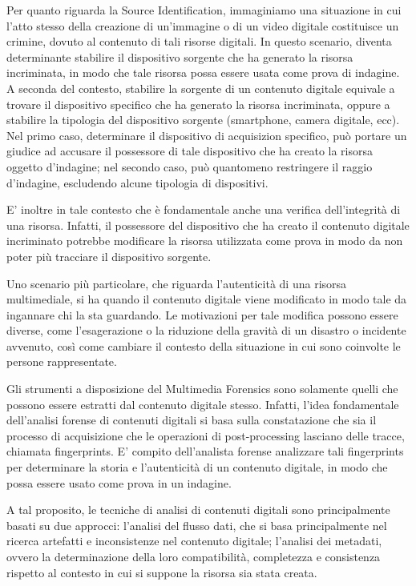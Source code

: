 Per quanto riguarda la Source Identification, immaginiamo una situazione in cui l'atto stesso della creazione di un'immagine o di un video digitale costituisce un crimine, dovuto al contenuto di tali risorse digitali. In questo scenario, diventa determinante stabilire il dispositivo sorgente che ha generato la risorsa incriminata, in modo che tale risorsa possa essere usata come prova di indagine. A seconda del contesto, stabilire la sorgente di un contenuto digitale equivale a trovare il dispositivo specifico che ha generato la risorsa incriminata, oppure a stabilire la tipologia del dispositivo sorgente (smartphone, camera digitale, ecc). Nel primo caso, determinare il dispositivo di acquisizion specifico, può portare un giudice ad accusare il possessore di tale dispositivo che ha creato la risorsa oggetto d'indagine; nel secondo caso, può quantomeno restringere il raggio d'indagine, escludendo alcune tipologia di dispositivi.

E' inoltre in tale contesto che è fondamentale anche una verifica dell'integrità di una risorsa. Infatti, il possessore del dispositivo che ha creato il contenuto digitale incriminato potrebbe modificare la risorsa utilizzata come prova in modo da non poter più tracciare il dispositivo sorgente.

Uno scenario più particolare, che riguarda l'autenticità di una risorsa multimediale, si ha quando il contenuto digitale viene modificato in modo tale da ingannare chi la sta guardando. Le motivazioni per tale modifica possono essere diverse, come l'esagerazione o la riduzione della gravità di un disastro o incidente avvenuto, così come cambiare il contesto della situazione in cui sono coinvolte le persone rappresentate.

Gli strumenti a disposizione del Multimedia Forensics sono solamente quelli che possono essere estratti dal contenuto digitale stesso. Infatti, l'idea fondamentale dell'analisi forense di contenuti digitali si basa sulla constatazione che sia il processo di acquisizione che le operazioni di post-processing lasciano delle tracce, chiamata fingerprints. E' compito dell'analista forense analizzare tali fingerprints per determinare la storia e l'autenticità di un contenuto digitale, in modo che possa essere usato come prova in un indagine.

A tal proposito, le tecniche di analisi di contenuti digitali sono principalmente basati su due approcci: l'analisi del flusso dati, che si basa principalmente nel ricerca artefatti e inconsistenze nel contenuto digitale; l'analisi dei metadati, ovvero la determinazione della loro compatibilità, completezza e consistenza rispetto al contesto in cui si suppone la risorsa sia stata creata.

